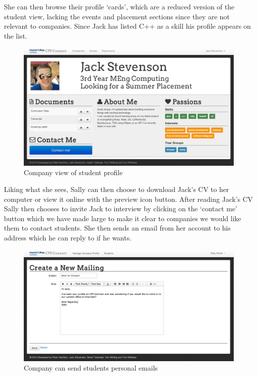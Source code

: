     She can then browse their profile `cards', which are a reduced version of the student view, lacking the events and placement sections since they are not relevant to companies. Since Jack has listed C++ as a skill his profile appears on the list.

    \begin{figure}[H]\centering
    \includegraphics[scale=0.3]{images/user_experiences/company/jack_profile}
    \caption{Company view of student profile}
    \end{figure}

    Liking what she sees, Sally can then choose to download Jack's CV to her computer or view it online with the preview icon button. After reading Jack's CV Sally then chooses to invite Jack to interview by clicking on the `contact me' button which we have made large to make it clear to companies we would like them to contact students. She then sends an email from her account to his address which he can reply to if he wants.


    \begin{figure}[H]\centering
    \includegraphics[scale=0.3]{images/user_experiences/company/jack_offer_email}
    \caption{Company can send students personal emails}
    \end{figure}


